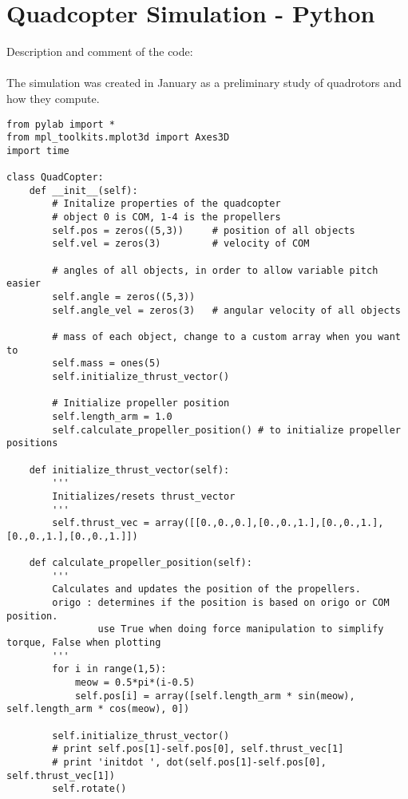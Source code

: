 

\section{Quadcopter Simulation - Python}

Description and comment of the code: \\
\\
The simulation was created in January as a preliminary study of quadrotors 
and how they compute. 

\begin{lstlisting}
from pylab import *
from mpl_toolkits.mplot3d import Axes3D
import time
 
class QuadCopter:
    def __init__(self):
        # Initalize properties of the quadcopter
        # object 0 is COM, 1-4 is the propellers
        self.pos = zeros((5,3))     # position of all objects
        self.vel = zeros(3)         # velocity of COM
        
        # angles of all objects, in order to allow variable pitch easier
        self.angle = zeros((5,3))   
        self.angle_vel = zeros(3)   # angular velocity of all objects
        
        # mass of each object, change to a custom array when you want to
        self.mass = ones(5)         
        self.initialize_thrust_vector()
 
        # Initialize propeller position
        self.length_arm = 1.0
        self.calculate_propeller_position() # to initialize propeller positions
 
    def initialize_thrust_vector(self):
        '''
        Initializes/resets thrust_vector
        '''
        self.thrust_vec = array([[0.,0.,0.],[0.,0.,1.],[0.,0.,1.],[0.,0.,1.],[0.,0.,1.]])
 
    def calculate_propeller_position(self):
        '''
        Calculates and updates the position of the propellers.
        origo : determines if the position is based on origo or COM position.
                use True when doing force manipulation to simplify torque, False when plotting
        '''
        for i in range(1,5):
            meow = 0.5*pi*(i-0.5)
            self.pos[i] = array([self.length_arm * sin(meow), self.length_arm * cos(meow), 0])

        self.initialize_thrust_vector()
        # print self.pos[1]-self.pos[0], self.thrust_vec[1]
        # print 'initdot ', dot(self.pos[1]-self.pos[0], self.thrust_vec[1])
        self.rotate()
 

\end{lstlisting}
